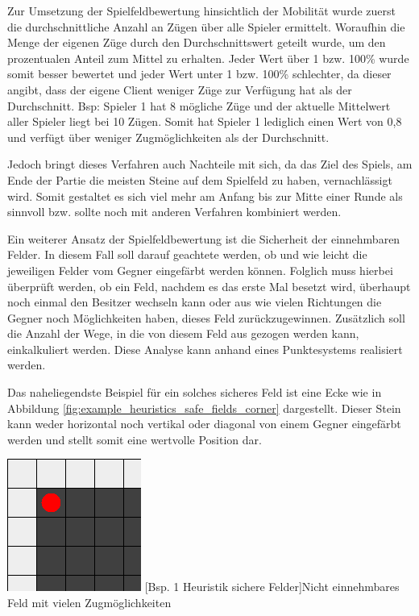 \documentclass[12pt,a4paper,bibliography=totocnumbered,listof=totocnumbered]{article}
\begin{document}
Zur Umsetzung der Spielfeldbewertung hinsichtlich der Mobilität wurde zuerst die durchschnittliche Anzahl an Zügen über alle Spieler ermittelt. Woraufhin die Menge der eigenen Züge durch den Durchschnittswert geteilt wurde, um den prozentualen Anteil zum Mittel zu erhalten. Jeder Wert über 1 bzw. 100\% wurde somit besser bewertet und jeder Wert unter 1 bzw. 100\% schlechter, da dieser angibt, dass der eigene Client weniger Züge zur Verfügung hat als der Durchschnitt. Bsp: Spieler 1 hat 8 mögliche Züge und der aktuelle Mittelwert aller Spieler liegt bei 10 Zügen. Somit hat Spieler 1 lediglich einen Wert von 0,8 und verfügt über weniger Zugmöglichkeiten als der Durchschnitt. 

Jedoch bringt dieses Verfahren auch Nachteile mit sich, da das Ziel des Spiels, am Ende der Partie die meisten Steine auf dem Spielfeld zu haben, vernachlässigt wird. Somit gestaltet es sich viel mehr am Anfang bis zur Mitte einer Runde als sinnvoll bzw. sollte noch mit anderen Verfahren kombiniert werden.

Ein weiterer Ansatz der Spielfeldbewertung ist die \glqq Sicherheit\grqq{} der einnehmbaren Felder. In diesem Fall soll darauf geachtete werden, ob und wie leicht die jeweiligen Felder vom Gegner eingefärbt werden können. Folglich muss hierbei überprüft werden, ob ein Feld, nachdem es das erste Mal besetzt wird, überhaupt noch einmal den Besitzer wechseln kann oder aus wie vielen Richtungen die Gegner noch Möglichkeiten haben, dieses Feld zurückzugewinnen. Zusätzlich soll die Anzahl der Wege, in die von diesem Feld aus gezogen werden kann, einkalkuliert werden. Diese Analyse kann anhand eines Punktesystems realisiert werden.

Das naheliegendste Beispiel für ein solches sicheres Feld ist eine Ecke wie in Abbildung \ref{fig:example_heuristics_safe_fields_corner} dargestellt. Dieser Stein kann weder horizontal noch vertikal oder diagonal von einem Gegner eingefärbt werden und stellt somit eine wertvolle Position dar. 

\vspace{1em}
\begin{minipage}{\linewidth}
	\centering
	\includegraphics[width=0.3\linewidth]{pics/heuristics_safe_fields_corner.png}
	[Bsp. 1 Heuristik sichere Felder]{Nicht einnehmbares Feld mit vielen 		Zugmöglichkeiten}
	\label{fig:example_heuristics_safe_fields_corner}
\end{minipage}
\\
\end{document}
